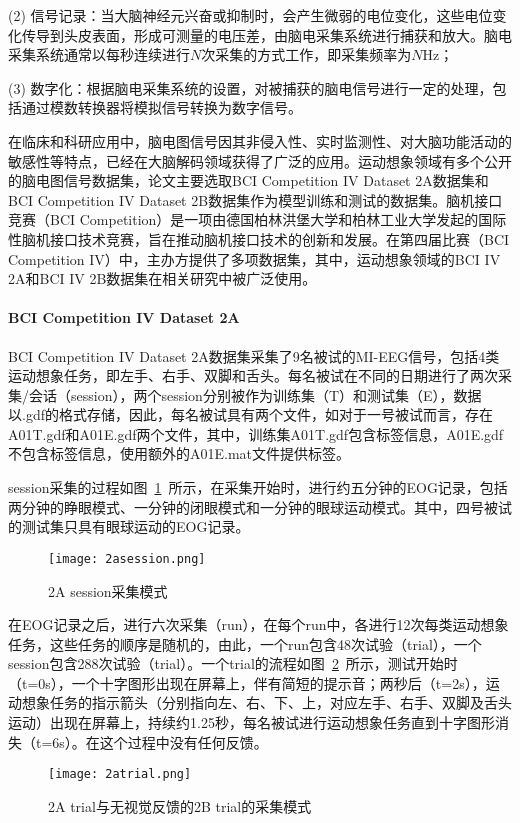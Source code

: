 (2) 信号记录：当大脑神经元兴奋或抑制时，会产生微弱的电位变化，这些电位变化传导到头皮表面，形成可测量的电压差，由脑电采集系统进行捕获和放大。脑电采集系统通常以每秒连续进行\(N\)次采集的方式工作，即采集频率为\(N\)Hz；

(3) 数字化：根据脑电采集系统的设置，对被捕获的脑电信号进行一定的处理，包括通过模数转换器将模拟信号转换为数字信号。

在临床和科研应用中，脑电图信号因其非侵入性、实时监测性、对大脑功能活动的敏感性等特点，已经在大脑解码领域获得了广泛的应用。运动想象领域有多个公开的脑电图信号数据集，论文主要选取BCI Competition IV Dataset 2A数据集\cite{brunner2008bci}和BCI Competition IV Dataset 2B数据集\cite{leeb2008bci}作为模型训练和测试的数据集。脑机接口竞赛（BCI Competition）是一项由德国柏林洪堡大学和柏林工业大学发起的国际性脑机接口技术竞赛，旨在推动脑机接口技术的创新和发展。在第四届比赛（BCI Competition IV）中，主办方提供了多项数据集，其中，运动想象领域的BCI IV 2A和BCI IV 2B数据集在相关研究中被广泛使用。

\paragraph{BCI Competition IV Dataset 2A}

BCI Competition IV Dataset 2A数据集采集了9名被试的MI-EEG信号，包括4类运动想象任务，即左手、右手、双脚和舌头。每名被试在不同的日期进行了两次采集/会话（session），两个session分别被作为训练集（T）和测试集（E），数据以.gdf的格式存储，因此，每名被试具有两个文件，如对于一号被试而言，存在A01T.gdf和A01E.gdf两个文件，其中，训练集A01T.gdf包含标签信息，A01E.gdf不包含标签信息，使用额外的A01E.mat文件提供标签。

session采集的过程如图~\ref{fig:2asession}~所示，在采集开始时，进行约五分钟的EOG记录，包括两分钟的睁眼模式、一分钟的闭眼模式和一分钟的眼球运动模式。其中，四号被试的测试集只具有眼球运动的EOG记录。
\begin{figure}[ht]
    \centering
    \texttt{[image: 2asession.png]}
    \caption{2A session采集模式\cite{brunner2008bci}}
    \label{fig:2asession}
\end{figure}

在EOG记录之后，进行六次采集（run），在每个run中，各进行12次每类运动想象任务，这些任务的顺序是随机的，由此，一个run包含48次试验（trial），一个session包含288次试验（trial）。一个trial的流程如图~\ref{fig:2atrial}~所示，测试开始时（t=0s），一个十字图形出现在屏幕上，伴有简短的提示音；两秒后（t=2s），运动想象任务的指示箭头（分别指向左、右、下、上，对应左手、右手、双脚及舌头运动）出现在屏幕上，持续约1.25秒，每名被试进行运动想象任务直到十字图形消失（t=6s）。在这个过程中没有任何反馈。
\begin{figure}[ht]
    \centering
    \texttt{[image: 2atrial.png]}
    \caption{2A trial与无视觉反馈的2B trial的采集模式\cite{brunner2008bci,leeb2008bci}}
    \label{fig:2atrial}
\end{figure}

